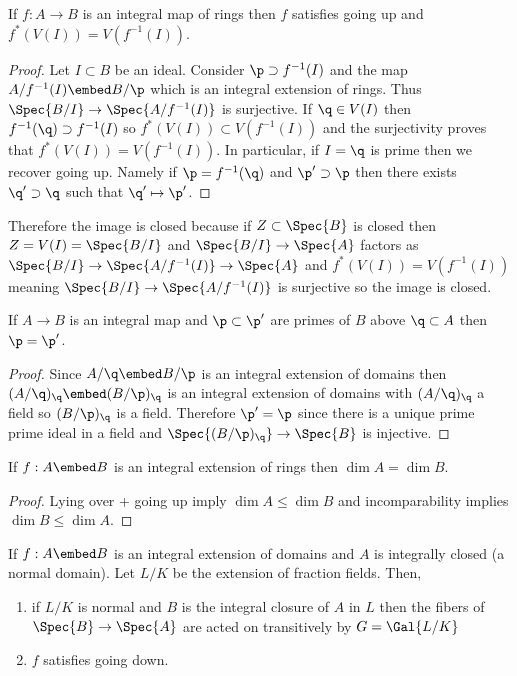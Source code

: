 \documentclass[12pt]{article}
\begin{document}
\begin{cor}[Going Up]
If $f : A \to B$ is an integral map of rings then $f$ satisfies going up and $f^*(V(I)) = V(f^{-1}(I))$.
\end{cor}

\begin{proof}
Let $I \subset B$ be an ideal. Consider $\p \supset f^{-1}(I)$ and the map $A / f^{-1}(I) \embed B / \p$ which is an integral extension of rings. Thus $\Spec{B/I} \to \Spec{A / f^{-1}(I)}$ is surjective. If $\q \in V(I)$ then $f^{-1}(\q) \supset f^{-1}(I)$ so $f^*(V(I)) \subset V(f^{-1}(I))$ and the surjectivity proves that $f^*(V(I)) = V(f^{-1}(I))$. In particular, if $I = \q$ is prime then we recover going up. Namely if $\p = f^{-1}(\q)$ and $\p' \supset \p$ then there exists $\q' \supset \q$ such that $\q' \mapsto \p'$. 
\end{proof}

\begin{rmk}
Therefore the image is closed because if $Z \subset \Spec{B}$ is closed then $Z = V(I) = \Spec{B/I}$ and $\Spec{B/I} \to \Spec{A}$ factors as $\Spec{B/I} \to \Spec{A/f^{-1}(I)} \to \Spec{A}$ and $f^*(V(I)) = V(f^{-1}(I))$ meaning $\Spec{B/I} \to \Spec{A / f^{-1}(I)}$ is surjective so the image is closed.
\end{rmk}

\begin{prop}[Incomparablility]
If $A \to B$ is an integral map and $\p \subset \p'$ are primes of $B$ above $\q \subset A$ then $\p = \p'$.
\end{prop}

\begin{proof}
Since $A / \q \embed B / \p$ is an integral extension of domains then $(A/\q)_\q \embed (B / \p)_\q$ is an integral extension of domains with $(A / \q)_\q$ a field so $(B / \p)_\q$ is a field. Therefore $\p' = \p$ since there is a unique prime prime ideal in a field and $\Spec{(B/\p)_\q} \to \Spec{B}$ is injective.
\end{proof}

\begin{cor}
If $f : A \embed B$ is an integral extension of rings then $\dim{A} = \dim{B}$.
\end{cor}

\begin{proof}
Lying over + going up imply $\dim{A} \le \dim{B}$ and incomparability implies $\dim{B} \le \dim{A}$. 
\end{proof}

\begin{prop} 
If $f : A \embed B$ is an integral extension of domains and $A$ is integrally closed (a normal domain). Let $L / K$ be the extension of fraction fields. Then,
\begin{enumerate}
\item if $L / K$ is normal and $B$ is the integral closure of $A$ in $L$ then the fibers of $\Spec{B} \to \Spec{A}$ are acted on transitively by $G = \Gal{L/K}$
\item $f$ satisfies going down.
\end{enumerate}
\end{prop}
\end{document}
